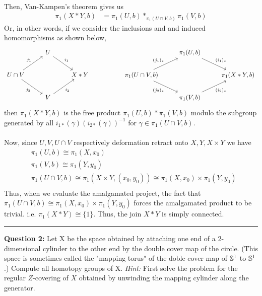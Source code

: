 \documentclass[11pt]{article}
\begin{document}
\\
Then, Van-Kampen's theorem gives us 
\begin{align*}
  \pi_1(X * Y, b) &= \pi_1(U, b) *_{\pi_1(U \cap V, b)} \pi_1(V, b)
\end{align*} Or, in other words, if we consider the inclusions and and induced homomorphisms as shown below,
\[\begin{tikzcd}
	& U &&&& {\pi_1(U, b)} \\
	{U \cap V} && {X * Y} && {\pi_1(U \cap V, b)} && {\pi_1(X * Y, b)} \\
	& V &&&& {\pi_1(V, b)}
	\arrow["{i_1}", from=1-2, to=2-3]
	\arrow["{(i_1)_*}", from=1-6, to=2-7]
	\arrow["{j_1}", from=2-1, to=1-2]
	\arrow["{j_2}"', from=2-1, to=3-2]
	\arrow["{(j_1)_*}", from=2-5, to=1-6]
	\arrow["{(j_2)_*}"', from=2-5, to=3-6]
	\arrow["{i_2}"', from=3-2, to=2-3]
	\arrow["{(i_2)_*}"', from=3-6, to=2-7]
\end{tikzcd}\] then $\pi_1(X * Y, b)$ is the free product $\pi_1(U, b) * \pi_1(V, b)$ modulo the subgroup generated by all $i_{1*}(\gamma) (i_{2*}(\gamma))^{-1} $ for $\gamma \in \pi_1(U \cap V, b)$.
\\
\\
Now, since $U, V, U \cap V$ respectively deformation retract onto $X, Y, X \times Y$ we have 
\begin{align*}
  &\pi_1(U, b) \cong \pi_1(X, x_0) \\
  &\pi_1(V, b) \cong \pi_1(Y, y_0) \\
  &\pi_1(U \cap V, b) \cong \pi_1(X \times Y, (x_0, y_0)) \cong \pi_1(X, x_0) \times \pi_1(Y, y_0) \\
\end{align*} Thus, when we evaluate the amalgamated project, the fact that $\pi_1(U \cap V, b) \cong \pi_1(X, x_0) \times \pi_1(Y, y_0)$ forces the amalgamated product to be trivial. i.e. $\pi_1(X * Y) \cong \{1\}$. Thus, the join $X * Y$ is simply connected. 

\vskip 0.5cm
\hrule
\pagebreak





\begin{bluebox}
  \textbf{Question 2:} Let X be the space obtained by attaching one end of a 2-dimensional cylinder to the other end by the double cover map of the circle. (This space is sometimes called the "mapping torus" of the doble-cover map of $\mathbb{S}^1$ to $\mathbb{S}^1$.) Compute all homotopy groups of X. {\emph{Hint:}} First solve the problem for the regular $Z$-covering of $X$ obtained by unwinding the mapping cylinder along the generator.
\end{bluebox}
\end{document}
